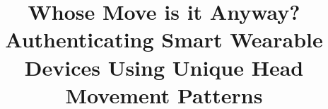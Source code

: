 \documentclass{IEEEtran}
\newcommand{\superscript}[1]{\ensuremath{^{\textrm{#1}}}}
\def\winlab{\superscript{\dag}}
\def\cmu{\superscript{$\ast$}}
\begin{document}
\title{Whose Move is it Anyway? Authenticating Smart Wearable Devices Using Unique Head Movement Patterns}



\begin{comment}
\numberofauthors{1}
\author{
\alignauthor
 Sugang Li\winlab, Ashwin Ashok\cmu, Yanyong Zhang\winlab, Chenren Xu\cmu, Macro Gruteser\winlab, Janne Lindqvist\winlab\\
\vspace{4mm}
        \affaddr{{\winlab}WINLAB, Rutgers University, North Brunswick,NJ, USA}\\
          \vspace{1mm}
        \affaddr{{\cmu}Carnegie Mellon University, Pittsburgh, PA, USA}\\
}
\end{comment}


\maketitle
\newcommand{\systemname}{{\em Headbanger}}











\balance
%


\end{document}

